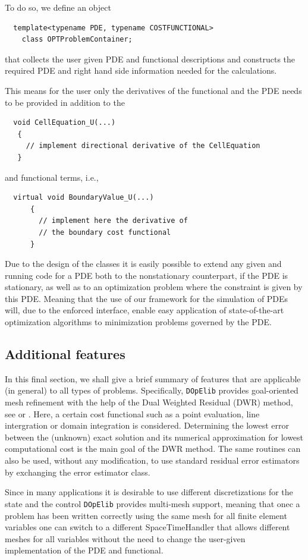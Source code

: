 \documentclass[prodmode,acmtoms]{acmsmall}
\numberwithin{equation}{section}
\newcommand{\dope}{\texttt{DOpElib}}
\begin{document}
To do so, we define an object 
\begin{lstlisting} 
  template<typename PDE, typename COSTFUNCTIONAL>
    class OPTProblemContainer;
\end{lstlisting}
that collects the user given PDE and functional descriptions and constructs the 
required PDE and right hand side information needed for the calculations.

This means for the user only the derivatives of the functional and the PDE 
needs to be provided in addition to the 
\begin{lstlisting} 
  void CellEquation_U(...)
   {
     // implement directional derivative of the CellEquation
   }
\end{lstlisting}
and functional terms, i.e.,     
\begin{lstlisting} 
  virtual void BoundaryValue_U(...)
      {
        // implement here the derivative of 
        // the boundary cost functional
      }
\end{lstlisting}

Due to the design of the classes it is easily possible to extend any given 
and running code for a PDE both to the nonstationary counterpart, if the PDE is 
stationary, as well as to an optimization problem where the constraint is 
given by this PDE. Meaning that the use of our framework for the simulation of 
PDEs will, due to the enforced interface, enable easy application of state-of-the-art 
optimization algorithms to minimization problems governed by the PDE.


\subsection{Additional features}
In this final section, we shall give a brief summary of features 
that are applicable (in general) to all types of problems. Specifically,
\dope{} provides goal-oriented mesh refinement with the help of the 
Dual Weighted Residual (DWR) method, see \cite{BeRa96} or \cite{BR03}. Here, a certain 
cost functional such as a point evaluation, line intergration or domain
integration is considered. Determining the lowest error between the 
(unknown) exact solution and its numerical approximation for lowest computational
cost is the main goal of the DWR method. The same routines 
can also be used, without any modification, to use standard residual error estimators by exchanging the 
error estimator class.

Since in many applications it is desirable to use different discretizations
for the state and the control \dope{} provides multi-mesh support, meaning that
onec a problem has been written correctly using the same mesh for all finite element
variables one can switch to a different SpaceTimeHandler that allows different meshes for all 
variables without the need to change the user-given implementation of the PDE and functional.
\end{document}
